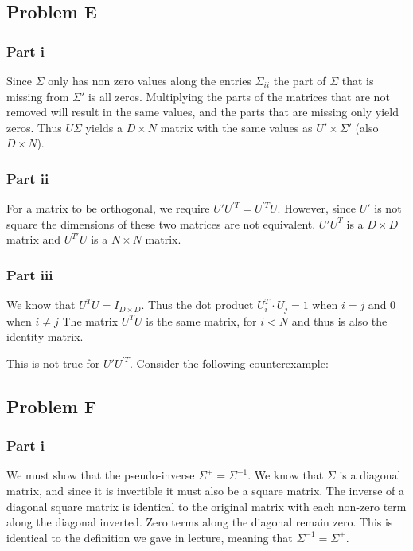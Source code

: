 \documentclass[12pt]{article} %
\begin{document}
\subsection{Problem E}
\subsubsection{Part i}
Since $\Sigma$ only has non zero values along the entries $\Sigma_{ii}$ the part of $\Sigma$ that is missing from $\Sigma '$ is all zeros. Multiplying the parts of the matrices that are not removed will result in the same values, and the parts that are missing only yield zeros. Thus $U \Sigma$ yields a $D \times N$ matrix with the same values as $U' \times \Sigma '$ (also $D \times N$).

\subsubsection{Part ii}
For a matrix to be orthogonal, we require $U'U^{'T} = U^{'T}U$. However, since $U'$ is not square the dimensions of these two matrices are not equivalent. $U'U^{T}$ is a $D \times D$ matrix and $U^{T'}U$ is a $N \times N$ matrix.

\subsubsection{Part iii}
We know that $U^T U = I_{D \times D}$. Thus the dot product $U^T_i \cdot U_j = 1$ when $i = j$ and 0 when $i \neq j$ The matrix $U^T U$ is the same matrix, for $i < N$ and thus is also the identity matrix.

This is not true for $U'U^{'T}$. Consider the following counterexample:
\begin{figure}[H]
	\vspace{-10mm}
\end{figure}


\subsection{Problem F}
\subsubsection{Part i}
We must show that the pseudo-inverse $\Sigma^{+} = \Sigma^{-1}$. We know that $\Sigma$ is a diagonal matrix, and since it is invertible it must also be a square matrix. The inverse of a diagonal square matrix is identical to the original matrix with each non-zero term along the diagonal inverted. Zero terms along the diagonal remain zero. This is identical to the definition we gave in lecture, meaning that $\Sigma^{-1} = \Sigma ^ {+}$.
\end{document}
